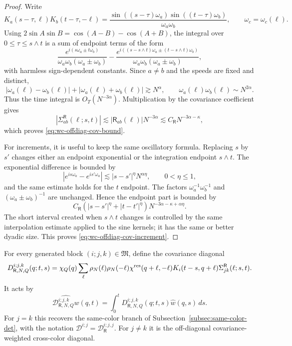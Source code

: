 \documentclass[10pt]{amsart}
\numberwithin{equation}{section}
\theoremstyle{plain}
\theoremstyle{definition}
\theoremstyle{remark}
\begin{document}
\begin{proof}
Write
\[
        K_a(s-\tau,\ell)K_b(t-\tau,-\ell)
        =\frac{\sin((s-\tau)\omega_a)\sin((t-\tau)\omega_b)}
        {\omega_a\omega_b},
        \qquad \omega_c=\omega_c(\ell).
\]
Using $2\sin A\sin B=\cos(A-B)-\cos(A+B)$, the integral over $0\le \tau\le s\wedge t$ is a sum of endpoint terms of the form
\[
        \frac{e^{i(s\omega_a\pm t\omega_b)}}{\omega_a\omega_b(\omega_a\pm\omega_b)}
        -
        \frac{e^{i((s-s\wedge t)\omega_a\pm (t-s\wedge t)\omega_b)}}
        {\omega_a\omega_b(\omega_a\pm\omega_b)},
\]
with harmless sign-dependent constants.  Since $a\ne b$ and the speeds are fixed and distinct,
\[
        |\omega_a(\ell)-\omega_b(\ell)|+|\omega_a(\ell)+\omega_b(\ell)|\gtrsim N^\alpha,
        \qquad \omega_a(\ell)\omega_b(\ell)\sim N^{2\alpha}.
\]
Thus the time integral is $O_T(N^{-3\alpha})$.  Multiplication by the covariance coefficient gives
\[
        |\Sigma_{ab}^{\mathsf R}(\ell;s,t)|
        \lesssim |\mathsf R_{ab}(\ell)|N^{-3\alpha}
        \lesssim C_{\mathsf R}N^{-3\alpha-\kappa},
\]
which proves \eqref{eq:wc-offdiag-cov-bound}.

For increments, it is useful to keep the same oscillatory formula.  Replacing $s$ by $s'$ changes either an endpoint exponential or the integration endpoint $s\wedge t$.  The exponential difference is bounded by
\[
        |e^{is\omega_a}-e^{is'\omega_a}|
        \lesssim |s-s'|^\eta N^{\alpha\eta},
        \qquad 0<\eta\le1,
\]
and the same estimate holds for the $t$ endpoint.  The factors $\omega_a^{-1}\omega_b^{-1}$ and $(\omega_a\pm\omega_b)^{-1}$ are unchanged.  Hence the endpoint part is bounded by
\[
        C_{\mathsf R}(|s-s'|^\eta+|t-t'|^\eta)
        N^{-3\alpha-\kappa+\alpha\eta}.
\]
The short interval created when $s\wedge t$ changes is controlled by the same interpolation estimate applied to the sine kernels; it has the same or better dyadic size.  This proves \eqref{eq:wc-offdiag-cov-increment}.
\end{proof}

For every generated block \((i;j,k)\in\mathfrak M\), define the covariance diagonal
\begin{equation}\label{eq:wc-diagonal-kernel}
D_{\mathsf R,N,Q}^{i;j,k}(q;t,s)
=\chi_Q(q)\sum_\ell \rho_N(\ell)\rho_N(-\ell)
\chi^{\rm res}(q+\ell,-\ell)K_i(t-s,q+\ell)
\Sigma_{jk}^{\mathsf R}(\ell;s,t).
\end{equation}
It acts by
\begin{equation}\label{eq:wc-diagonal-operator}
\widehat{\mathcal D_{\mathsf R,N,Q}^{i;j,k}w}(q,t)
=\int_0^tD_{\mathsf R,N,Q}^{i;j,k}(q;t,s)\widehat w(q,s)\,ds.
\end{equation}
For \(j=k\) this recovers the same-color branch of Subsection~\ref{subsec:same-color-det}, with the notation \(\mathcal D^{i;j}=\mathcal D_{\mathsf R}^{i;j,j}\).  For \(j\ne k\) it is the off-diagonal covariance-weighted cross-color diagonal.
\end{document}
